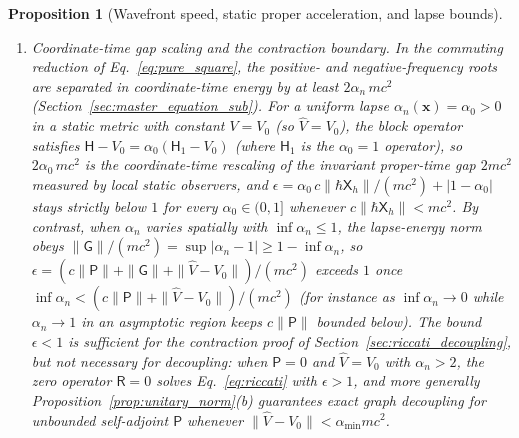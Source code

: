\documentclass[aps,prd,onecolumn,tightenlines,nofootinbib,notitlepage,11pt,floatfix]{revtex4-2}
\theoremstyle{indentedtheorem}
\newtheorem{proposition}{Proposition}
\begin{document}
\begin{proposition}[Wavefront speed, static proper acceleration, and lapse bounds]
\begin{enumerate}[label=(\roman*)]
\item \emph{Coordinate-time gap scaling and the contraction boundary.} In the commuting reduction of Eq.~\eqref{eq:pure_square}, the positive- and negative-frequency roots are separated in coordinate-time energy by at least $2\alpha_n\,mc^2$ (Section~\ref{sec:master_equation_sub}). For a uniform lapse $\alpha_n(\mathbf{x})=\alpha_0>0$ in a static metric with constant $V=V_0$ (so $\hat{V}=V_0$), the block operator satisfies $\mathsf{H}-V_0 = \alpha_0(\mathsf{H}_1-V_0)$ (where $\mathsf{H}_1$ is the $\alpha_0=1$ operator), so $2\alpha_0\,mc^2$ is the coordinate-time rescaling of the invariant proper-time gap $2mc^2$ measured by local static observers, and $\epsilon = \alpha_0\,c\|\hbar\mathsf{X}_h\|/(mc^2) + |1-\alpha_0|$ stays strictly below $1$ for every $\alpha_0\in(0,1]$ whenever $c\|\hbar\mathsf{X}_h\| < mc^2$. By contrast, when $\alpha_n$ varies spatially with $\inf\alpha_n\le 1$, the lapse-energy norm obeys $\|\mathsf{G}\|/(mc^2) = \sup|\alpha_n - 1| \ge 1 - \inf\alpha_n$, so $\epsilon = (c\|\mathsf{P}\|+\|\mathsf{G}\|+\|\hat{V}-V_0\|)/(mc^2)$ exceeds $1$ once $\inf\alpha_n < (c\|\mathsf{P}\|+\|\hat{V}-V_0\|)/(mc^2)$ (for instance as $\inf\alpha_n\to 0$ while $\alpha_n\to 1$ in an asymptotic region keeps $c\|\mathsf{P}\|$ bounded below). The bound $\epsilon < 1$ is sufficient for the contraction proof of Section~\ref{sec:riccati_decoupling}, but not necessary for decoupling: when $\mathsf{P}=0$ and $\hat{V}=V_0$ with $\alpha_n > 2$, the zero operator $\mathsf{R}=0$ solves Eq.~\eqref{eq:riccati} with $\epsilon > 1$, and more generally Proposition~\ref{prop:unitary_norm}(b) guarantees exact graph decoupling for unbounded self-adjoint $\mathsf{P}$ whenever $\|\hat{V}-V_0\|<\alpha_{\min}mc^2$.
\end{enumerate}
\end{proposition}
\end{document}
